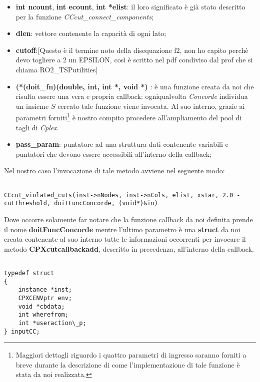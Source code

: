 \documentclass[11pt]{article}
\begin{document}
\begin{itemize}
    \item \textbf{int ncount}, \textbf{int ecount}, \textbf{int *elist}: il loro significato è già stato descritto per la funzione \textit{CCcut\_connect\_components};
    \item \textbf{dlen}: vettore contenente la capacità di ogni lato;
    \item \textbf{cutoff}:[Questo è il termine noto della disequazione f2, non ho capito perchè devo togliere a 2 un EPSILON, così è scritto nel pdf condiviso dal prof che si chiama         RO2\_TSPutilities]
    \item \textbf{(*(doit\_fn)(double, int, int *, void *) }: è una funzione creata da noi che risulta essere una vera e propria callback: ogniqualvolta \textit{Concorde} individua un insieme $S$ cercato tale funzione viene invocata. Al suo interno, grazie ai parametri forniti\footnote{Maggiori dettagli riguardo i quattro parametri di ingresso saranno forniti a breve durante la descrizione di come l'implementazione di tale funzione è stata da noi realizzata.} è nostro compito procedere all'ampliamento del pool di tagli di \textit{Cplex}.
    \item \textbf{pass\_param}: puntatore ad una struttura dati contenente variabili e puntatori che devono essere accessibili all’interno della callback;
\end{itemize}

Nel nostro caso l'invocazione di tale metodo avviene nel seguente modo:

\begin{lstlisting}

CCcut_violated_cuts(inst->nNodes, inst->nCols, elist, xstar, 2.0 - cutThreshold, doitFuncConcorde, (void*)&in)

\end{lstlisting}

Dove occorre solamente far notare che la funzione callback da noi definita prende il nome \textbf{doitFuncConcorde} mentre l'ultimo parametro è una \textbf{struct} da noi creata contenente al suo interno tutte le informazioni occorrenti per invocare il metodo \textbf{CPXcutcallbackadd}, descritto in precedenza, all'interno della callback.

\begin{lstlisting}

typedef struct 
{
    instance *inst;
    CPXCENVptr env;
    void *cbdata;
    int wherefrom;
    int *useraction\_p;
} inputCC;

\end{lstlisting}
\end{document}
